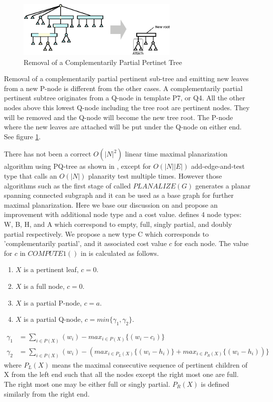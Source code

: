 \documentclass[a4]{jgaa-art}
\begin{document}
\begin{figure}[!htb]
  \centering
  \includegraphics[width=0.7\textwidth]{pq_tree_com}
  \caption{Removal of a Complementarily Partial Pertinet Tree}
  \label{fig:pq_tree_com}
\end{figure}


Removal of a complementarily partial pertinent sub-tree and emitting new leaves
from a new P-node is different from the other cases.
A complementarily partial pertinent subtree originates from a Q-node
in template P7, or Q4. All the other nodes above this lowest Q-node including the tree root
are pertinent nodes.
They will be removed and the Q-node will become the new tree root. 
The P-node where the new leaves are attached will be put under
the Q-node on either end. See figure \ref{fig:pq_tree_com}.


There has not been a correct $O(|N|^2)$ linear time maximal planarization algorithm using PQ-tree as shown 
in \cite{JUNGER97}, except for $O(|N||E|)$ add-edge-and-test type that calls an $O(|N|)$ planarity test multiple times.
However those algorithms such as the first stage of \cite{JTS89} called
$PLANALIZE(G)$ generates a planar spanning connected subgraph and it can be used as a base graph for further maximal planarization. 
Here we base our discussion on \cite{JTS89} and propose an improvement with additional
node type and a cost value. \cite{JTS89} defines 4 node types: W, B, H, and A which correspond to
empty, full, singly partial, and doubly partial respectively. We propose a new type C which
corresponds to 'complementarily partial', and it associated cost value $c$ for each node.
The value for $c$ in $COMPUTE1()$ in \cite{JTS89} is calculated as follows.
\begin{enumerate}
\item $X$ is a pertinent leaf, $c = 0$.
\item $X$ is a full node, $c = 0$.
\item $X$ is a partial P-node, $c = a$.
\item $X$ is a partial Q-node, $c = min\{\gamma_1,\gamma_2\}$.
\end{enumerate}
\begin{equation}
\begin{aligned}
  \gamma_1 &= \sum_{i \in P(X)}(w_i) - max_{i \in P(X)}\{(w_i - c_i)\} \\
  \gamma_2 &= \sum_{i \in P(X)}(w_i) - (max_{i \in P_L(X)}\{(w_i - h_i)\}
                                       + max_{i \in P_R(X)}\{(w_i - h_i))\}
\end{aligned}
\end{equation}
where $P_L(X)$ means the maximal consecutive sequence of pertinent children of X from the
left end such that all the nodes except the right most one are full. The right most one
may be either full or singly partial. $P_R(X)$ is defined similarly from the right end.
\end{document}
